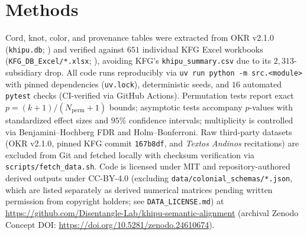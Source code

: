 \documentclass[11pt,a4paper]{article}
\begin{document}
\section{Methods}

Cord, knot, color, and provenance tables were extracted from OKR v2.1.0 (\texttt{khipu.db}; \citealt{okr2025v210}) and verified against $651$ individual KFG Excel workbooks (\texttt{KFG\_DB\_Excel/*.xlsx}; \citealt{khosla2024kfg}), avoiding KFG's \texttt{khipu\_summary.csv} due to its $2{,}313$-subsidiary drop. All code runs reproducibly via \texttt{uv run python -m src.<module>} with pinned dependencies (\texttt{uv.lock}), deterministic seeds, and $16$ automated \texttt{pytest} checks (CI-verified via GitHub Actions). Permutation tests report exact $p = (k+1)/(N_{\mathrm{perm}}+1)$ bounds; asymptotic tests accompany $p$-values with standardized effect sizes and $95\%$ confidence intervals; multiplicity is controlled via Benjamini--Hochberg FDR \citep{benjamini1995controlling} and Holm--Bonferroni. Raw third-party datasets (OKR v2.1.0, pinned KFG commit \texttt{167b8df}, and \emph{Textos Andinos} recitations) are excluded from Git and fetched locally with checksum verification via \texttt{scripts/fetch\_data.sh}. Code is licensed under MIT and repository-authored derived outputs under CC-BY-4.0 (excluding \texttt{data/colonial\_schemas/*.json}, which are listed separately as derived numerical matrices pending written permission from copyright holders; see \texttt{DATA\_LICENSE.md}) at \url{https://github.com/Disentangle-Lab/khipu-semantic-alignment} (archival Zenodo Concept DOI: \url{https://doi.org/10.5281/zenodo.24610674}).



\end{document}
